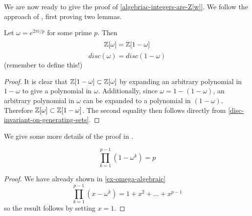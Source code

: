We are now ready to give the proof of \cref{algebriac-integers-are-Z[w]}. We follow the approach of \cite{NumberFields}, first proving two lemmas.
\begin{lemma}
Let $\omega=e^{2\pi i/p}$ for some prime $p.$ Then $$\mathbb{Z}[\omega]=\mathbb{Z}[1-\omega]$$ $$disc(\omega)=disc(1-\omega)$$
(remember to define this!)
\end{lemma}
\begin{proof}
It is clear that $\mathbb{Z}[1-\omega]\subset\mathbb{Z}[\omega]$ by expanding an arbitrary polynomial in $1-\omega$ to give a polynomial in $\omega$. Additionally, since $\omega=1-(1-\omega)$, an arbitrary polynomial in $\omega$ can be expanded to a polynomial in $(1-\omega).$ Therefore $\mathbb{Z}[\omega]\subset \mathbb{Z}[1-\omega]$. 
The second equality then follows directly from \cref{disc-invariant-on-generating-sets}.
\end{proof}
We give some more details of the proof in \cite{NumberFields}.
\begin{lemma}\label{product-of-1-omegak-p}
$$\prod_{k=1}^{p-1}(1-\omega^k)=p$$
\end{lemma}
\begin{proof}
We have already shown in \cref{ex-omega-algebraic}
$$\prod_{k=1}^{p-1}(x-\omega^k)=1+x^2+\dots+x^{p-1}$$
so the result follows by setting $x=1$.
\end{proof}

